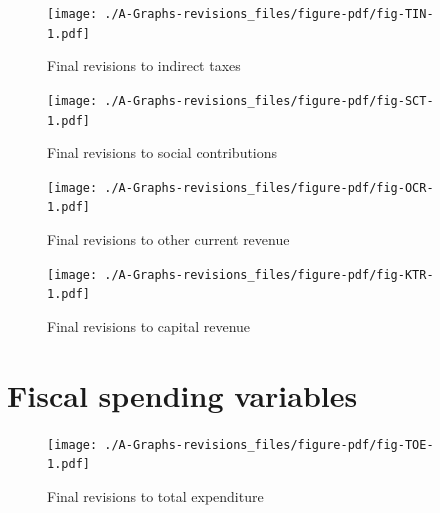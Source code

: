 \documentclass[
  letterpaper,
  authoryear,
  preprint,
  3p]{elsarticle}
\begin{document}
\pagebreak

\begin{figure}[H]

{\centering \texttt{[image: ./A-Graphs-revisions\_files/figure-pdf/fig-TIN-1.pdf]}

}

\caption{\label{fig-TIN}Final revisions to indirect taxes}

\end{figure}

\pagebreak

\begin{figure}[H]

{\centering \texttt{[image: ./A-Graphs-revisions\_files/figure-pdf/fig-SCT-1.pdf]}

}

\caption{\label{fig-SCT}Final revisions to social contributions}

\end{figure}

\pagebreak

\begin{figure}[H]

{\centering \texttt{[image: ./A-Graphs-revisions\_files/figure-pdf/fig-OCR-1.pdf]}

}

\caption{\label{fig-OCR}Final revisions to other current revenue}

\end{figure}

\pagebreak

\begin{figure}[H]

{\centering \texttt{[image: ./A-Graphs-revisions\_files/figure-pdf/fig-KTR-1.pdf]}

}

\caption{\label{fig-KTR}Final revisions to capital revenue}

\end{figure}

\hypertarget{fiscal-spending-variables}{%
\section{Fiscal spending variables}\label{fiscal-spending-variables}}

\begin{figure}[H]

{\centering \texttt{[image: ./A-Graphs-revisions\_files/figure-pdf/fig-TOE-1.pdf]}

}

\caption{\label{fig-TOE}Final revisions to total expenditure}

\end{figure}
\end{document}
